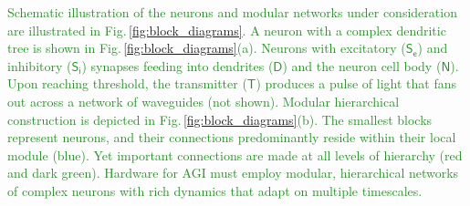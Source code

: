 \documentclass[twocolumn]{article}
\begin{document}
\textcolor{ForestGreen}{Schematic illustration of the neurons and modular networks under consideration are illustrated in Fig.\,\ref{fig:block_diagrams}. A neuron with a complex dendritic tree is shown in Fig.\,\ref{fig:block_diagrams}(a). Neurons with excitatory ($\mathsf{S_e}$) and inhibitory ($\mathsf{S_i}$) synapses feeding into dendrites ($\mathsf{D}$) and the neuron cell body ($\mathsf{N}$). Upon reaching threshold, the transmitter ($\mathsf{T}$) produces a pulse of light that fans out across a network of waveguides (not shown). Modular hierarchical construction is depicted in Fig.\,\ref{fig:block_diagrams}(b). The smallest blocks represent neurons, and their connections predominantly reside within their local module (blue). Yet important connections are made at all levels of hierarchy (red and dark green). Hardware for AGI must employ modular, hierarchical networks of complex neurons with rich dynamics that adapt on multiple timescales.}
\begin{figure}[t!]
\end{figure}
\end{document}
